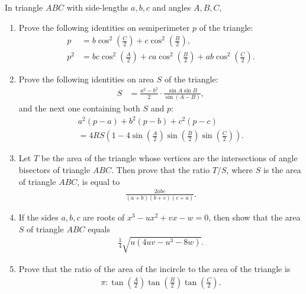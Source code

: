 \begin{tcolorbox}[title={Makshud's Exercises on Area \& Perimeter}]
    \begin{question}[name={Makshud's Identities on Area and Semiperimeter}]
        In triangle $ABC$ with side-lengths $a,b,c$ and angles $A,B,C$, 
        \begin{enumerate}
            \item Prove the following identities on semiperimeter $p$ of the triangle:
        \begin{align*}
            p&= b\cos^2\left(\frac{C}{2}\right)+c\cos^2\left(\frac{B}{2}\right),\\
            p^2&= bc\cos^2\left(\frac{A}{2}\right)+ca\cos^2\left(\frac{B}{2}\right)+ab\cos^2\left(\frac{C}{2}\right).
        \end{align*}
        \item Prove the following identities on area $S$ of the triangle:
        \begin{align*}
            S &= \frac{a^2-b^2}{2}\cdot\frac{\sin A \sin B}{\sin(A-B)},
        \end{align*}
        and the next one containing both $S$ and $p$:
        \begin{multline*}
            a^2(p-a)+b^2(p-b)+c^2(p-c) \\ = 4RS\left(1-4\sin\left(\frac{A}{2}\right)\sin\left(\frac{B}{2}\right)\sin\left(\frac{C}{2}\right)\right).
        \end{multline*}
        \item Let $T$ be the area of the triangle whose vertices are the intersections of angle bisectors of triangle $ABC$. Then prove that the ratio $T/S$, where $S$ is the area of triangle $ABC$, is equal to
        \begin{align*}
            \frac{2abc}{(a+b)(b+c)(c+a)}.
        \end{align*}
        \item If the sides $a,b,c$ are roots of $x^3-ux^2+vx-w=0$, then show that the area $S$ of triangle $ABC$ equals
        \begin{align*}
            \frac{1}{4}\sqrt{u(4uv-u^3-8w)}.
        \end{align*}
        \item Prove that the ratio of the area of the incircle to the area of the triangle is
        \begin{align*}
            \pi:\tan\left(\frac{A}{2}\right)\tan\left(\frac{B}{2}\right)\tan\left(\frac{C}{2}\right).
        \end{align*}
        \end{enumerate}
    \end{question}
\end{tcolorbox}


